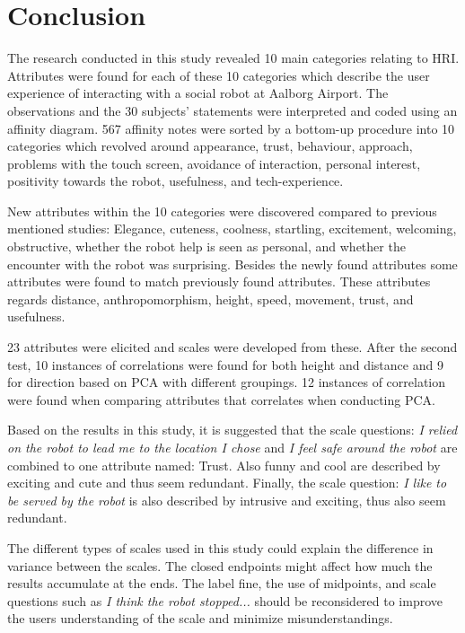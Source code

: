 \section{Conclusion}
\label{Conclusion}
%
The research conducted in this study revealed 10 main categories relating to HRI. Attributes were found for each of these 10 categories which describe the user experience of interacting with a social robot at Aalborg Airport. The observations and the 30 subjects' statements were interpreted and coded using an affinity diagram. 567 affinity notes were sorted by a bottom-up procedure into 10 categories which revolved around appearance, trust, behaviour, approach, problems with the touch screen, avoidance of interaction, personal interest, positivity towards the robot, usefulness, and tech-experience.

New attributes within the 10 categories were discovered compared to previous mentioned studies: Elegance, cuteness, coolness, startling, excitement, welcoming, obstructive, whether the robot help is seen as personal, and whether the encounter with the robot was surprising. Besides the newly found attributes some attributes were found to match previously found attributes. These attributes regards distance, anthropomorphism, height, speed, movement, trust, and usefulness.

23 attributes were elicited and scales were developed from these. After the second test, 10 instances of correlations were found for both height and distance and 9 for direction based on PCA with different groupings. 12 instances of correlation were found when comparing attributes that correlates when conducting PCA.

Based on the results in this study, it is suggested that the scale questions: \textit{I relied on the robot to lead me to the location I chose} and \textit{I feel safe around the robot} are combined to one attribute named: Trust. Also funny and cool are described by exciting and cute and thus seem redundant. Finally, the scale question: \textit{I like to be served by the robot} is also described by intrusive and exciting, thus also seem redundant.

The different types of scales used in this study could explain the difference in variance between the scales. The closed endpoints might affect how much the results accumulate at the ends. The label fine, the use of midpoints, and scale questions such as \textit{I think the robot stopped...} should be reconsidered to improve the users understanding of the scale and minimize misunderstandings. 

